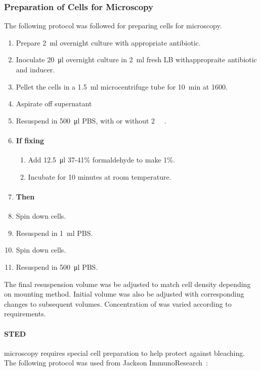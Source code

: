 \documentclass[../main.tex]{subfiles}
\begin{document}
\subsubsection{Preparation of Cells for Microscopy}

The following protocol was followed for preparing cells for microscopy.

\begin{enumerate}
\item Prepare \SI{2}{\milli\litre} overnight culture with appropriate antibiotic.
\item Inoculate \SI{20}{\micro\litre} overnight culture in \SI{2}{\milli\litre} fresh LB withappropraite antibiotic and inducer.
\item Pellet the cells in a \SI{1.5}{\milli\litre} microcentrifuge tube for \SI{10}{\minute} at \SI{1600}{\grav}.
\item Aspirate off supernatant
\item Resuspend in \SI{500}{\micro\litre} PBS, with or without \SI{2}{\milli\Molar} .
\item \paragraph{If fixing}
\begin{enumerate}
\item Add \SI{12.5}{\micro\litre} 37-41\% formaldehyde to make 1\%.
\item Incubate for 10 minutes at room temperature.
\end{enumerate}
\item[] \paragraph{Then}
\item Spin down cells.
\item Resuspend in \SI{1}{\milli\litre} PBS.
\item Spin down cells.
\item Resuspend in \SI{500}{\micro\litre} PBS.
\end{enumerate}

The final resuspension volume was be adjusted to match cell density depending on mounting method. Initial volume was also be adjusted with corresponding changes to subsequent volumes. Concentration of  was varied according to requirements.

\paragraph{STED} microscopy requires special cell preparation to help protect against bleaching. The following protocol was used from Jackson ImmunoResearch~\citep{jackson}:
\end{document}

